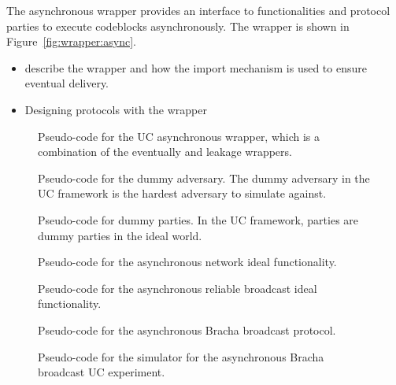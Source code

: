 The asynchronous wrapper provides an interface to functionalities and protocol parties to execute codeblocks asynchronously.
The wrapper is shown in Figure~\ref{fig:wrapper:async}.

\begin{itemize}
\item describe the wrapper and how the import mechanism is used to ensure eventual delivery.
\item Designing protocols with the wrapper
\end{itemize}

\begin{figure}
\centering
	
	\caption{Pseudo-code for the UC asynchronous wrapper, which is a combination of the eventually and leakage wrappers.}
	\label{fig:wrapper_async_new}
\end{figure}

\begin{figure}
\centering
	
	\caption{Pseudo-code for the dummy adversary. The dummy adversary in the UC framework is the hardest adversary to simulate against.}
	\label{fig:dummy_adversary}
\end{figure}

\begin{figure}
\centering
	
	\caption{Pseudo-code for dummy parties. In the UC framework, parties are dummy parties in the ideal world.}
	\label{fig:dummy_party}
\end{figure}

\begin{figure}
\centering
	
	\caption{Pseudo-code for the asynchronous network ideal functionality.}
	\label{fig:f_async_explicit}
\end{figure}

\begin{figure}
\centering
	
	\caption{Pseudo-code for the asynchronous reliable broadcast ideal functionality.}
	\label{fig:f_rbc}
\end{figure}

\begin{figure}
\centering
	
	\caption{Pseudo-code for the asynchronous Bracha broadcast protocol.}
	\label{fig:prot_bracha_async}
\end{figure}

\begin{figure}
\centering
	
	\caption{Pseudo-code for the simulator for the asynchronous Bracha broadcast UC experiment.}
	\label{fig:sim_bracha_async}
\end{figure}

